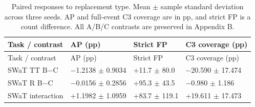 \documentclass[pdflatex,sn-apa]{sn-jnl}
\begin{document}
\begin{longtable}[]{@{}
  >{\raggedright\arraybackslash}p{}
  >{\raggedleft\arraybackslash}p{}
  >{\raggedleft\arraybackslash}p{}
  >{\raggedleft\arraybackslash}p{}@{}}
\caption{Paired responses to replacement type. Mean \ensuremath{\pm} sample standard
deviation across three seeds. AP and full-event C3 coverage are in pp,
and strict FP is a count difference. All A/B/C contrasts are preserved
in Appendix B.}\tabularnewline
\toprule\noalign{}
\begin{minipage}[b]{\linewidth}\raggedright
Task / contrast
\end{minipage} & \begin{minipage}[b]{\linewidth}\raggedleft
AP (pp)
\end{minipage} & \begin{minipage}[b]{\linewidth}\raggedleft
Strict FP
\end{minipage} & \begin{minipage}[b]{\linewidth}\raggedleft
C3 coverage (pp)
\end{minipage} \\
\midrule\noalign{}
\endfirsthead
\toprule\noalign{}
\begin{minipage}[b]{\linewidth}\raggedright
Task / contrast
\end{minipage} & \begin{minipage}[b]{\linewidth}\raggedleft
AP (pp)
\end{minipage} & \begin{minipage}[b]{\linewidth}\raggedleft
Strict FP
\end{minipage} & \begin{minipage}[b]{\linewidth}\raggedleft
C3 coverage (pp)
\end{minipage} \\
\midrule\noalign{}
\endhead
\bottomrule\noalign{}
\endlastfoot
SWaT TT B\ensuremath{-}C & \ensuremath{-}1.2138 \ensuremath{\pm} 0.9034 & +11.7 \ensuremath{\pm} 80.0 & \ensuremath{-}20.590 \ensuremath{\pm} 17.474 \\
SWaT R B\ensuremath{-}C & \ensuremath{-}0.0156 \ensuremath{\pm} 0.2856 & +95.3 \ensuremath{\pm} 43.5 & \ensuremath{-}0.980 \ensuremath{\pm} 1.186 \\
SWaT interaction & +1.1982 \ensuremath{\pm} 1.0959 & +83.7 \ensuremath{\pm} 119.1 & +19.611 \ensuremath{\pm}
17.473 \\

\end{longtable}
\end{document}
